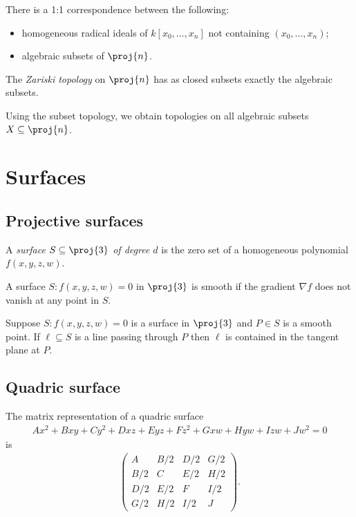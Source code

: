 \documentclass{article}
\begin{document}
\begin{corollary}
  There is a 1:1 correspondence between the following:
  \begin{itemize}
    \item homogeneous radical ideals of $k[x_0,\ldots,x_n]$ not containing $(x_0,\ldots,x_n)$;
    \item algebraic subsets of $\proj{n}$.
  \end{itemize}
\end{corollary}

\begin{definition}
  The \emph{Zariski topology} on $\proj{n}$ has as closed subsets exactly the algebraic
  subsets.

  Using the subset topology, we obtain topologies on all algebraic subsets $X\subseteq \proj{n}$.
\end{definition}

\section{Surfaces}

\subsection{Projective surfaces}

\begin{definition}
  A \emph{surface $S\subseteq\proj{3}$ of degree $d$} is the zero set of a homogeneous
  polynomial $f(x,y,z,w)$.
\end{definition}

\begin{definition}
  A surface $S:f(x,y,z,w)=0$ in $\proj{3}$ is smooth if the gradient $\nabla f$ does not
  vanish at any point in $S$.
\end{definition}

\begin{proposition}
  Suppose $S:f(x,y,z,w)=0$ is a surface in $\proj{3}$ and $P\in S$ is a smooth point. If
  $\ell\subseteq S$ is a line passing through $P$ then $\ell$ is contained in the tangent plane
  at $P$.
\end{proposition}

\subsection{Quadric surface}

The matrix representation of a quadric surface
\begin{align*}
  Ax^2 + Bxy + Cy^2 + Dxz + Eyz + Fz^2 + Gxw + Hyw + Izw + Jw^2 = 0
\end{align*}
is
\begin{align*}
  \begin{pmatrix}
    A & B/2 & D/2 & G/2\\
    B/2 & C & E/2 & H/2\\
    D/2 & E/2 & F & I/2\\
    G/2 & H/2 & I/2 & J
  \end{pmatrix}.
\end{align*}
\end{document}
